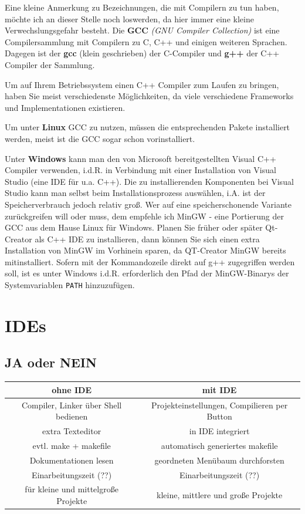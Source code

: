 \documentclass[a4paper]{report}
\begin{document}

Eine kleine Anmerkung zu Bezeichnungen, die mit Compilern zu tun haben, möchte ich an dieser Stelle noch loswerden, da hier immer eine kleine Verwechslungsgefahr besteht. Die \textbf{GCC} \textit{(GNU Compiler Collection)} ist eine Compilersammlung mit Compilern zu C, C++ und einigen weiteren Sprachen. Dagegen ist der \textbf{gcc} (klein geschrieben) der C-Compiler und \textbf{g++} der C++ Compiler der Sammlung.
\medskip

Um auf Ihrem Betriebssystem einen C++ Compiler zum Laufen zu bringen, haben Sie meist verschiedenste Möglichkeiten, da viele verschiedene Frameworks und Implementationen existieren.
\medskip

Um unter \textbf{Linux} GCC zu nutzen, müssen die entsprechenden Pakete installiert werden, meist ist die GCC sogar schon vorinstalliert.
\medskip

Unter \textbf{Windows} kann man den von Microsoft bereitgestellten Visual C++ Compiler verwenden, i.d.R. in Verbindung mit einer Installation von Visual Studio (eine IDE für u.a. C++). Die zu installierenden Komponenten bei Visual Studio kann man selbst beim Installationsprozess auswählen, i.A. ist der Speicherverbrauch jedoch relativ groß. Wer auf eine speicherschonende Variante zurückgreifen will oder muss, dem empfehle ich MinGW - eine Portierung der GCC aus dem Hause Linux für Windows. Planen Sie früher oder später Qt-Creator als C++ IDE zu installieren, dann können Sie sich einen extra Installation von MinGW im Vorhinein sparen, da QT-Creator MinGW bereits mitinstalliert. Sofern mit der Kommandozeile direkt auf g++ zugegriffen werden soll, ist es unter Windows i.d.R. erforderlich den Pfad der MinGW-Binarys der Systemvariablen \texttt{PATH} hinzuzufügen.


\section{IDEs}
\subsection{JA oder NEIN}
\begin{center}
\begin{tabular}{|c||c|}
	\hline
	\textbf{ohne IDE} & \textbf{mit IDE} \\
	\hline \hline
	Compiler, Linker über Shell bedienen	&	Projekteinstellungen, Compilieren per Button \\
	extra Texteditor				&		in IDE integriert\\
	evtl. make + makefile	&	automatisch generiertes makefile \\
	Dokumentationen lesen & geordneten Menübaum durchforsten\\
	\hline \hline
	Einarbeitungszeit (??) & Einarbeitungszeit (??) \\
	für kleine und mittelgroße Projekte & kleine, mittlere und große Projekte \\
	\hline
\end{tabular}
\end{center}
\end{document}
